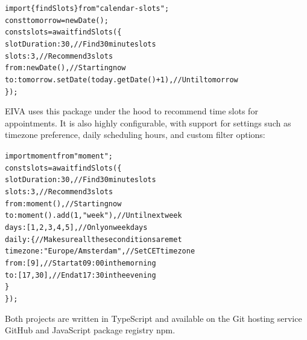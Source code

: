 \documentclass{article}
\begin{document}
\begin{alltt}
\textcolor{keyword}{import} \{ findSlots \} \textcolor{keyword}{from} \textcolor{string}{"calendar-slots"};
\textcolor{keyword}{const} tomorrow = \textcolor{keyword}{new} Date();
\textcolor{keyword}{const} slots = \textcolor{keyword}{await} \textcolor{variable}{findSlots}(\{
  \textcolor{symbol}{slotDuration}: \textcolor{literal}{30}, \textcolor{comment}{// Find 30 minute slots}
  \textcolor{symbol}{slots}: \textcolor{literal}{3}, \textcolor{comment}{// Recommend 3 slots}
  \textcolor{symbol}{from}: \textcolor{keyword}{new} Date(), \textcolor{comment}{// Starting now}
  \textcolor{symbol}{to}: tomorrow.\textcolor{variable}{setDate}(today.\textcolor{variable}{getDate}() + \textcolor{literal}{1}), \textcolor{comment}{// Until tomorrow}
\});
\end{alltt}

EIVA uses this package under the hood to recommend time slots for appointments. It is also highly configurable, with support for settings such as timezone preference, daily scheduling hours, and custom filter options:

\begin{alltt}
\textcolor{keyword}{import} moment from \textcolor{string}{"moment"};
\textcolor{keyword}{const} slots = \textcolor{keyword}{await} \textcolor{variable}{findSlots}(\{
  \textcolor{symbol}{slotDuration}: \textcolor{literal}{30}, \textcolor{comment}{// Find 30 minute slots}
  \textcolor{symbol}{slots}: \textcolor{literal}{3}, \textcolor{comment}{// Recommend 3 slots}
  \textcolor{symbol}{from}: moment(), \textcolor{comment}{// Starting now}
  \textcolor{symbol}{to}: moment().\textcolor{variable}{add}(\textcolor{literal}{1}, \textcolor{string}{"week"}), \textcolor{comment}{// Until next week}
  \textcolor{symbol}{days}: [\textcolor{literal}{1}, \textcolor{literal}{2}, \textcolor{literal}{3}, \textcolor{literal}{4}, \textcolor{literal}{5}], \textcolor{comment}{// Only on week days}
  \textcolor{symbol}{daily}: \{ \textcolor{comment}{// Make sure all these conditions are met}
    \textcolor{symbol}{timezone}: \textcolor{string}{"Europe/Amsterdam"}, \textcolor{comment}{// Set CET timezone}
    \textcolor{symbol}{from}: [\textcolor{literal}{9}], \textcolor{comment}{// Start at 09:00 in the morning}
    \textcolor{symbol}{to}: [\textcolor{literal}{17}, \textcolor{literal}{30}], \textcolor{comment}{// End at 17:30 in the evening}
  \}
\});
\end{alltt}

Both projects are written in TypeScript and available on the Git hosting service GitHub and JavaScript package registry npm.
\end{document}
